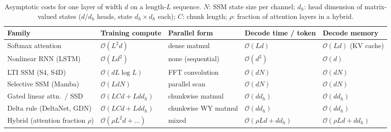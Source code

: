 \documentclass[a4paper]{article}
\newcommand{\bigO}{\mathcal{O}}
\theoremstyle{plain}
\theoremstyle{remark}
\begin{document}
\begin{table}[t]
\centering
\caption{Asymptotic costs for one layer of width $d$ on a length-$L$ sequence. $N$: SSM state size per channel; $d_h$: head dimension of matrix-valued states ($d/d_h$ heads, state $d_h\times d_h$ each); $C$: chunk length; $\rho$: fraction of attention layers in a hybrid.}
\label{tab:complexity}
\small
\setlength{\tabcolsep}{5pt}
\renewcommand{\arraystretch}{1.15}
\begin{tabular}{@{}lllll@{}}
\toprule
\textbf{Family} & \textbf{Training compute} & \textbf{Parallel form} & \textbf{Decode time / token} & \textbf{Decode memory} \\
\midrule
Softmax attention & $\bigO(L^2d)$ & dense matmul & $\bigO(Ld)$ & $\bigO(Ld)$ (KV cache) \\
Nonlinear RNN (LSTM) & $\bigO(Ld^2)$ & none (sequential) & $\bigO(d^2)$ & $\bigO(d)$ \\
LTI SSM (S4, S4D) & $\bigO(dL\log L)$ & FFT convolution & $\bigO(dN)$ & $\bigO(dN)$ \\
Selective SSM (Mamba) & $\bigO(LdN)$ & parallel scan & $\bigO(dN)$ & $\bigO(dN)$ \\
Gated linear attn.\ / SSD & $\bigO(LCd+Ldd_h)$ & chunkwise matmul & $\bigO(dd_h)$ & $\bigO(dd_h)$ \\
Delta rule (DeltaNet, GDN) & $\bigO(LCd+Ldd_h)$ & chunkwise WY matmul & $\bigO(dd_h)$ & $\bigO(dd_h)$ \\
Hybrid (attention fraction $\rho$) & $\bigO(\rho L^2d+\dots)$ & mixed & $\bigO(\rho Ld+dd_h)$ & $\bigO(\rho Ld+dd_h)$ \\
\bottomrule
\end{tabular}
\end{table}
\end{document}
